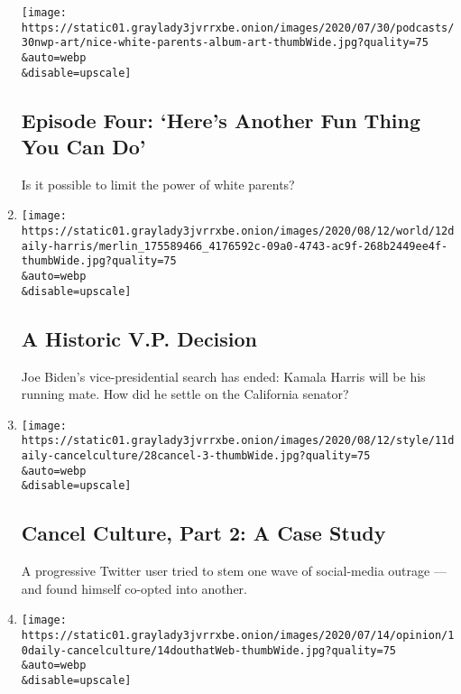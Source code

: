 \begin{enumerate}
  \texttt{[image: https://static01.graylady3jvrrxbe.onion/images/2020/07/30/podcasts/30nwp-art/nice-white-parents-album-art-thumbWide.jpg?quality=75\\\&auto=webp\\\&disable=upscale]}

  \hypertarget{episode-four-heres-another-fun-thing-you-can-do}{%
  \subsection{Episode Four: `Here's Another Fun Thing You Can
  Do'}\label{episode-four-heres-another-fun-thing-you-can-do}}

  Is it possible to limit the power of white parents?
\item
  \href{/2020/08/12/podcasts/the-daily/biden-kamala-harris-vp.html}{}

  \texttt{[image: https://static01.graylady3jvrrxbe.onion/images/2020/08/12/world/12daily-harris/merlin\_175589466\_4176592c-09a0-4743-ac9f-268b2449ee4f-thumbWide.jpg?quality=75\\\&auto=webp\\\&disable=upscale]}

  \hypertarget{a-historic-vp-decision}{%
  \subsection{A Historic V.P. Decision}\label{a-historic-vp-decision}}

  Joe Biden's vice-presidential search has ended: Kamala Harris will be
  his running mate. How did he settle on the California senator?
\item
  \href{/2020/08/11/podcasts/the-daily/cancel-culture.html}{}

  \texttt{[image: https://static01.graylady3jvrrxbe.onion/images/2020/08/12/style/11daily-cancelculture/28cancel-3-thumbWide.jpg?quality=75\\\&auto=webp\\\&disable=upscale]}

  \hypertarget{cancel-culture-part-2-a-case-study}{%
  \subsection{Cancel Culture, Part 2: A Case
  Study}\label{cancel-culture-part-2-a-case-study}}

  A progressive Twitter user tried to stem one wave of social-media
  outrage --- and found himself co-opted into another.
\item
  \href{/2020/08/10/podcasts/the-daily/cancel-culture.html}{}

  \texttt{[image: https://static01.graylady3jvrrxbe.onion/images/2020/07/14/opinion/10daily-cancelculture/14douthatWeb-thumbWide.jpg?quality=75\\\&auto=webp\\\&disable=upscale]}


\end{enumerate}
